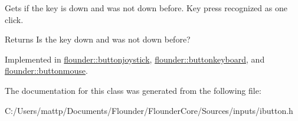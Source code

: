 Gets if the key is down and was not down before. Key press recognized as one click. 

\begin{DoxyReturn}{Returns}
Is the key down and was not down before? 
\end{DoxyReturn}


Implemented in \hyperlink{classflounder_1_1buttonjoystick_a99302b1345fa773ec839290ae6c406e7}{flounder\+::buttonjoystick}, \hyperlink{classflounder_1_1buttonkeyboard_abc6b3c8cf9398f2a896408e390fd3a01}{flounder\+::buttonkeyboard}, and \hyperlink{classflounder_1_1buttonmouse_a7dad01481ebb01755db054a0acbc8159}{flounder\+::buttonmouse}.



The documentation for this class was generated from the following file\+:\begin{DoxyCompactItemize}
\item 
C\+:/\+Users/mattp/\+Documents/\+Flounder/\+Flounder\+Core/\+Sources/inputs/ibutton.\+h\end{DoxyCompactItemize}
